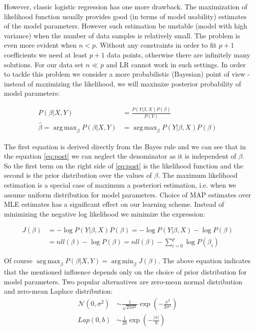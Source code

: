 \documentclass[12pt, wide]{mwart}
\DeclareMathOperator*{\argmax}{arg\,max}
\DeclareMathOperator*{\argmin}{arg\,min}
\begin{document}
However, classic logistic regression has one more drawback. The maximization of likelihood function usually provides good (in terms of model usability) estimates of the model parameters. However such estimation be unstable (model with high variance) when the number of data samples is relatively small. The problem is even more evident when $n < p$. Without any constraints in order to fit $p+1$ coefficients we need at least $p+1$ data points, otherwise there are infinitely many solutions. For our data set $n \ll p$ and LR cannot work in such settings. In order to tackle this problem we consider a more probabilistic (Bayesian) point of view - instead of maximizing the likelihood, we will maximize posterior probability of model parameters:

\begin{align}
    P(\beta| X,Y) &= \frac{P(Y | \beta, X)P(\beta)}{P(Y)} \nonumber \\
    \hat{\beta} = \argmax_{\beta} P(\beta| X,Y) &= \argmax_{\beta} P(Y | \beta, X)P(\beta) \label{eq:post}
\end{align}

The first equation is derived directly from the Bayes rule and we can see that in the equation \ref{eq:post} we can neglect the denominator as it is independent of $\beta$. So the first term on the right side of \ref{eq:post} is the likelihood function and the second is the prior distribution over the values of $\beta$. The maximum likelihood estimation is a special case of maximum a posteriori estimation, i.e. when we assume uniform distribution for model parameters.  Choice of MAP estimates over MLE estimates has a significant effect on our learning scheme. Instead of minimizing the negative log likelihood we minimize the expression:

\begin{align}
    J(\beta) &= - \log P(Y | \beta, X)P(\beta) =  - \log P(Y | \beta, X) - \log P(\beta) \nonumber \\ &= nll(\beta) - \log P(\beta) = nll(\beta) - \sum_{i=0}^p \log P(\beta_i) \label{eq:learnPost}
\end{align}

Of course $\argmax_{\beta} P(\beta| X,Y) = \argmin_{\beta} J(\beta)$. The above equation indicates that the mentioned influence depends only on the choice of prior distribution for model parameters. Two popular alternatives are zero-mean normal distribution and zero-mean Laplace distribution:
\begin{align*}
    \mathcal{N}(0, \sigma^2) &\sim \frac{1}{\sqrt{2 \pi \sigma^{2}}} \exp \left(-\frac{x^{2}}{2 \sigma^{2}}\right) \\
    Lap(0, b) &\sim \frac{1}{2 b} \exp \left(-\frac{|x|}{b}\right)
\end{align*}
\end{document}
